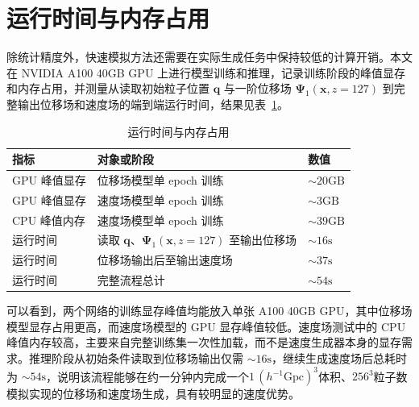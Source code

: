 \section{运行时间与内存占用}

除统计精度外，快速模拟方法还需要在实际生成任务中保持较低的计算开销。本文在 NVIDIA A100 40GB GPU 上进行模型训练和推理，记录训练阶段的峰值显存和内存占用，并测量从读取初始粒子位置 \(\boldsymbol{q}\) 与一阶位移场 \(\boldsymbol{\Psi}_1(\boldsymbol{x},z=127)\) 到完整输出位移场和速度场的端到端运行时间，结果见表~\ref{tab:runtime-memory}。

\begin{table}[H]
  \centering
  \small
  \caption{运行时间与内存占用}
  \label{tab:runtime-memory}
  \begin{tabular}{lll}
    \toprule
    指标 & 对象或阶段 & 数值 \\
    \midrule
    GPU 峰值显存 & 位移场模型单 epoch 训练 & $\sim 20 \mathrm{GB}$ \\
    GPU 峰值显存 & 速度场模型单 epoch 训练 & $\sim 3 \mathrm{GB}$ \\
    CPU 峰值内存 & 速度场模型单 epoch 训练 & $\sim 39 \mathrm{GB}$ \\
    运行时间 & 读取 \(\boldsymbol{q}\)、\(\boldsymbol{\Psi}_1(\boldsymbol{x},z=127)\) 至输出位移场 & $\sim 16 \mathrm{s}$ \\
    运行时间 & 位移场输出后至输出速度场 & $\sim 37 \mathrm{s}$ \\
    运行时间 & 完整流程总计 & $\sim 54 \mathrm{s}$ \\
    \bottomrule
  \end{tabular}
\end{table}

可以看到，两个网络的训练显存峰值均能放入单张 A100 40GB GPU，其中位移场模型显存占用更高，而速度场模型的 GPU 显存峰值较低。速度场测试中的 CPU 峰值内存较高，主要来自完整训练集一次性加载，而不是速度生成器本身的显存需求。推理阶段从初始条件读取到位移场输出仅需 $\sim 16 \mathrm{s}$，继续生成速度场后总耗时为 $\sim 54 \mathrm{s}$，说明该流程能够在约一分钟内完成一个$1\,\left(h^{-1}\mathrm{Gpc}\right)^3$体积、$256^3$粒子数模拟实现的位移场和速度场生成，具有较明显的速度优势。
